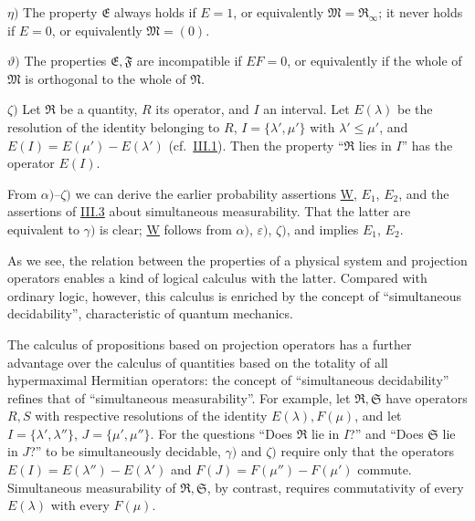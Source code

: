 \documentclass[fontsize=13pt,twoside,openany,headings=normal,parskip=false,bookmarkpackage=false,DIV=calc]{scrbook}
\begin{document}
\leavevmode{}\label{post:III.5.eta}$\eta)$ The property $\mathfrak E$ always holds if $E=1$, or equivalently $\mathfrak M=\mathfrak R_\infty$; it never holds if $E=0$, or equivalently $\mathfrak M=(0)$.

\leavevmode{}\label{post:III.5.theta}$\vartheta)$ The properties $\mathfrak E,\mathfrak F$ are incompatible if $EF=0$, or equivalently if the whole of $\mathfrak M$ is orthogonal to the whole of $\mathfrak N$.

\leavevmode{}\label{post:III.5.zeta}$\zeta)$ Let $\mathfrak R$ be a quantity, $R$ its operator, and $I$ an interval. Let $E(\lambda)$ be the resolution of the identity belonging to $R$, $I=\{\lambda',\mu'\}$ with $\lambda'\le\mu'$, and $E(I)=E(\mu')-E(\lambda')$ (cf.\ \hyperref[sec:III.1]{III.1}). Then the property ``$\mathfrak R$ lies in $I$'' has the operator $E(I)$.

From \hyperref[post:III.5.alpha]{$\alpha)$}--\hyperref[post:III.5.zeta]{$\zeta)$} we can derive the earlier probability assertions \hyperref[post:III.1.W]{W}, \hyperref[post:III.1.E1]{$E_1$}, \hyperref[post:III.1.E2]{$E_2$}, and the assertions of \hyperref[sec:III.3]{III.3} about simultaneous measurability. That the latter are equivalent to \hyperref[post:III.5.gamma]{$\gamma)$} is clear; \hyperref[post:III.1.W]{W} follows from \hyperref[post:III.5.alpha]{$\alpha)$}, \hyperref[post:III.5.epsilon]{$\varepsilon)$}, \hyperref[post:III.5.zeta]{$\zeta)$}, and implies \hyperref[post:III.1.E1]{$E_1$}, \hyperref[post:III.1.E2]{$E_2$}.

As we see, the relation between the properties of a physical system and projection operators enables a kind of logical calculus with the latter. Compared with ordinary logic, however, this calculus is enriched by the concept of ``simultaneous decidability'', characteristic of quantum mechanics.

The calculus of propositions based on projection operators has a further advantage over the calculus of quantities based on the totality of all hypermaximal Hermitian operators: the concept of ``simultaneous decidability'' refines that of ``simultaneous measurability''. For example, let $\mathfrak R,\mathfrak S$ have operators $R,S$ with respective resolutions of the identity $E(\lambda),F(\mu)$, and let $I=\{\lambda',\lambda''\}$, $J=\{\mu',\mu''\}$. For the questions ``Does $\mathfrak R$ lie in $I$?'' and ``Does $\mathfrak S$ lie in $J$?'' to be simultaneously decidable, \hyperref[post:III.5.gamma]{$\gamma)$} and \hyperref[post:III.5.zeta]{$\zeta)$} require only that the operators $E(I)=E(\lambda'')-E(\lambda')$ and $F(J)=F(\mu'')-F(\mu')$ commute. Simultaneous measurability of $\mathfrak R,\mathfrak S$, by contrast, requires commutativity of every $E(\lambda)$ with every $F(\mu)$.
\end{document}
